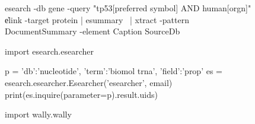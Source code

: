 \newsavebox{\mylistingbox}
\begin{figure}
   \begin{lrbox}{\mylistingbox}%
    \begin{minipage}{\linewidth}%
      \begin{bash}
esearch -db gene -query "tp53[preferred symbol] AND human[orgn]"  \|
elink -target protein  | esummary  \ |
xtract -pattern DocumentSummary -element Caption SourceDb
\end{bash}
    \end{minipage}%
  \end{lrbox}%
\hfill
  \begin{lrbox}{\mylistingbox}%
    \begin{minipage}{\linewidth}%
      \begin{python}
import esearch.esearcher

p = {'db':'nucleotide',
     'term':'biomol trna',
     'field':'prop'}
es = esearch.esearcher.Esearcher('esearcher', email)
print(es.inquire(parameter=p).result.uids)
\end{python}
    \end{minipage}%
  \end{lrbox}%
\hfill
  \begin{lrbox}{\mylistingbox}%
    \begin{minipage}{\linewidth}%
      \begin{python}
import wally.wally


\end{python}
\end{minipage}
\end{lrbox}
\end{figure}
